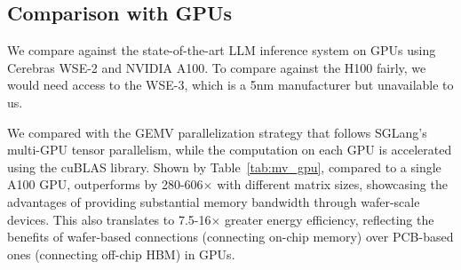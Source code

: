 \vspace{-0.2cm}
\subsection{Comparison with GPUs}\label{sec:eval:gpu}
\vspace{-0.2cm}

\begin{table}[t]
  \centering
  \caption{Comparing \gemv(WSE-2) with TP in SGLang(A100) of GEMV latency and energy.}
  \vspace{-0.3cm}
  \label{tab:mv_gpu}%
\end{table}%

We compare \sys against the state-of-the-art LLM inference system on GPUs using Cerebras WSE-2 and NVIDIA A100. To compare against the H100 fairly, we would need access to the WSE-3, which is a 5nm manufacturer but unavailable to us.

 We compared \gemv with the GEMV parallelization strategy that follows SGLang's \cite{sglang} multi-GPU tensor parallelism, while the computation on each GPU is accelerated using the cuBLAS library. Shown by Table~\ref{tab:mv_gpu}, compared to a single A100 GPU, \gemv outperforms by 280-606$\times$ with different matrix sizes, showcasing the advantages of providing substantial memory bandwidth through wafer-scale devices. This also translates to 7.5-16$\times$ greater energy efficiency, reflecting the benefits of wafer-based connections (connecting on-chip memory) over PCB-based ones (connecting off-chip HBM) in GPUs.

